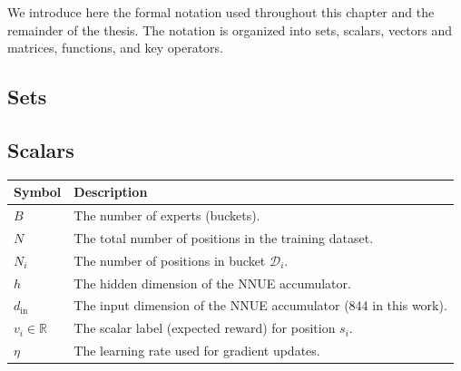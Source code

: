 We introduce here the formal notation used throughout this chapter and the remainder of the thesis. The notation is organized into sets, scalars, vectors and matrices, functions, and key operators.

\subsection{Sets}

\begin{center}
\end{center}


\subsection{Scalars}

\begin{center}
\small
\begin{tabular}{ll}
\toprule
Symbol & Description \\
\midrule
$B$ & The number of experts (buckets). \\
$N$ & The total number of positions in the training dataset. \\
$N_i$ & The number of positions in bucket $\mathcal{D}_i$. \\
$h$ & The hidden dimension of the NNUE accumulator. \\
$d_{\text{in}}$ & The input dimension of the NNUE accumulator (844 in this work). \\
$v_i \in \mathbb{R}$ & The scalar label (expected reward) for position $s_i$. \\
$\eta$ & The learning rate used for gradient updates. \\
\bottomrule
\end{tabular}
\end{center}


